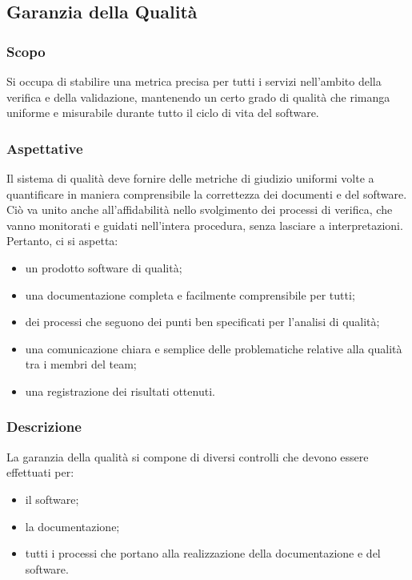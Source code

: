\subsection{Garanzia della Qualità}

	\subsubsection{Scopo}

		Si occupa di stabilire una metrica precisa per tutti i servizi nell'ambito della verifica e della validazione, mantenendo un certo grado di qualità che rimanga uniforme e misurabile durante tutto il ciclo di vita del software.

	\subsubsection{Aspettative}

		Il sistema di qualità deve fornire delle metriche di giudizio uniformi volte a quantificare in maniera comprensibile la correttezza dei documenti e del software. Ciò va unito anche all'affidabilità nello svolgimento dei processi di verifica, che vanno monitorati e guidati nell'intera procedura, senza lasciare a interpretazioni. Pertanto, ci si aspetta:
		\begin{itemize}
			\item un prodotto software di qualità;
			\item una documentazione completa e facilmente comprensibile per tutti;
			\item dei processi che seguono dei punti ben specificati per l'analisi di qualità;
			\item una comunicazione chiara e semplice delle problematiche relative alla qualità tra i membri del team;
			\item una registrazione dei risultati ottenuti.
		\end{itemize}

	\subsubsection{Descrizione}

		La garanzia della qualità si compone di diversi controlli che devono essere effettuati per:
		\begin{itemize}
			\item il software;
			\item la documentazione;
			\item tutti i processi che portano alla realizzazione della documentazione e del software.
		\end{itemize}

